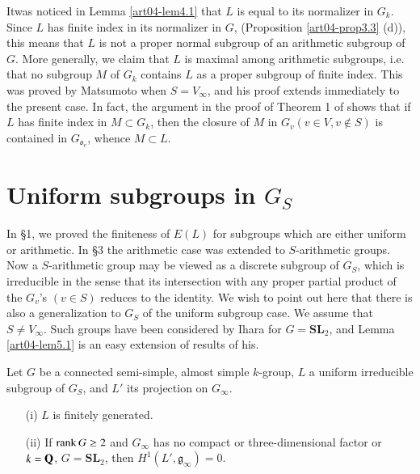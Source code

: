 \begin{remark}\label{art04-rem4.7}
It\pageoriginale was noticed in Lemma \ref{art04-lem4.1} that $L$ is equal to its normalizer in $G_{k}$. Since $L$ has finite index in its normalizer in $G$, (Proposition \ref{art04-prop3.3} (d)), this means that $L$ is not a proper normal subgroup of an arithmetic subgroup of $G$. More generally, we claim that $L$ is maximal among arithmetic subgroups, i.e. that no subgroup $M$ of $G_{k}$ contains $L$ as a proper subgroup of finite index. This was proved by Matsumoto \cite{art04-key23} when $S=V_{\infty}$, and his proof extends immediately to the present case. In fact, the argument in the proof of Theorem 1 of \cite{art04-key23} shows that if $L$ has finite index in $M\subset G_{k}$, then the closure of $M$ in $G_{v}(v\in V, v\not\in S)$ is contained in $G_{\mathfrak{o}_{v}}$, whence $M\subset L$.
\end{remark}

\section{Uniform subgroups in $G_{S}$}\label{art04-sec5}

In \S1, we proved the finiteness of $E(L)$ for subgroups which are either uniform or arithmetic. In \S3 the arithmetic case was extended to $S$-arithmetic groups. Now a $S$-arithmetic group may be viewed as a discrete subgroup of $G_{S}$, which is irreducible in the sense that its intersection with any proper partial product of the $G_{v}$'s $(v\in S)$ reduces to the identity. We wish to point out here that there is also a generalization to $G_{S}$ of the uniform subgroup case. We assume that $S\neq V_{\infty}$. Such groups have been considered by Ihara \cite{art04-key14} for $G=\mathbf{SL}_{2}$, and Lemma \ref{art04-lem5.1} is an easy extension of results of his.

\begin{lemma}\label{art04-lem5.1}
Let $G$ be a connected semi-simple, almost simple $k$-group, $L$ a uniform irreducible subgroup of $G_{S}$, and $L'$ its projection on $G_{\infty}$.
\begin{itemize}
\item[{\rm(i)}] $L$ is finitely generated.

\item[{\rm(ii)}] If $\operatorname{\mathrm{rank}} G\geq 2$ and $G_{\infty}$ has no compact or three-dimensional factor or $k=\mathbf{Q}$, $G=\mathbf{SL}_{2}$, then $H^{1}(L',\mathfrak{g}_{\infty})=0$.
\end{itemize}
\end{lemma}

